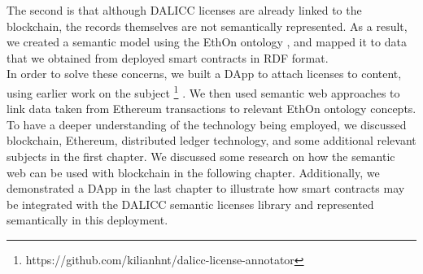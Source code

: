 The second is that although DALICC licenses are already linked to the blockchain, the records themselves are not semantically represented. As a result, we created a semantic model using the EthOn ontology \cite{http://ethon.consensys.net/}, and mapped it to data that we obtained from deployed smart contracts in RDF format. \\
In order to solve these concerns, we built a DApp to attach licenses to content, using earlier work on the subject \footnote{https://github.com/kilianhnt/dalicc-license-annotator} \cite{David}. We then used semantic web approaches to link data taken from Ethereum transactions to relevant EthOn ontology concepts. \\
To have a deeper understanding of the technology being employed, we discussed blockchain, Ethereum, distributed ledger technology, and some additional relevant subjects in the first chapter. We discussed some research on how the semantic web can be used with blockchain in the following chapter. Additionally, we demonstrated a DApp in the last chapter to illustrate how smart contracts may be integrated with the DALICC semantic licenses library and represented semantically in this deployment. \\